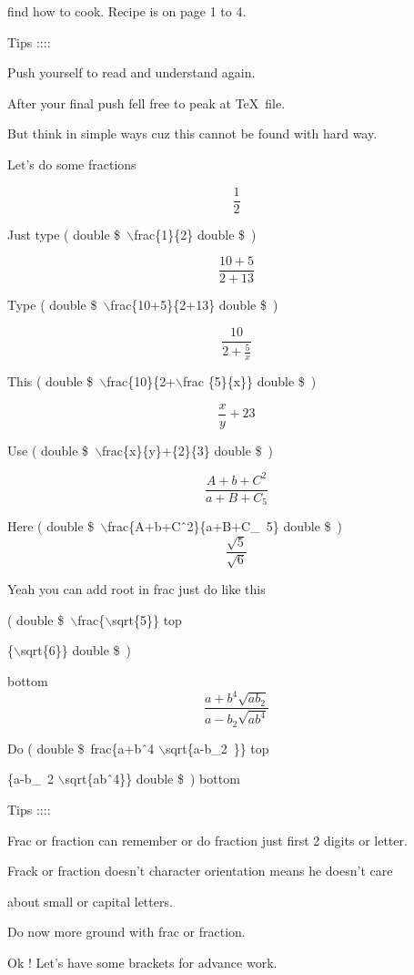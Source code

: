\documentclass[11pt]{article}
\begin{document}
find how to cook. Recipe is on page 1 to 4.

Tips ::::

Push yourself to read and understand again.

After your final push fell free to peak at \TeX\ file.

But think in simple ways cuz this cannot be found with hard way.

\pagebreak

Let's do some fractions

$$\frac{1}{2}$$

Just type ( double \$\ $\backslash$frac\{1\}\{2\} double \$\ )

$$\frac{10+5}{2+13}$$

Type ( double \$\ $\backslash$frac\{10+5\}\{2+13\} double \$\ )

$$\frac{10}{2+\frac{5}{x}}$$

This ( double \$\ $\backslash$frac\{10\}\{2+$\backslash$frac \{5\}\{x\}\} double \$\ )

$$\frac{x}{y}+{2}{3}$$

Use ( double \$\ $\backslash$frac\{x\}\{y\}+\{2\}\{3\} double \$\ )

$$\frac{A+b+C^2}{a+B+C_5}$$

Here ( double \$\ $\backslash$frac\{A+b+C\^\ 2\}\{a+B+C\_\ 5\} double \$\ )
$$\frac{\sqrt{5}}{\sqrt{6}}$$

Yeah you can add root in frac just do like this  

{( double \$\ $\backslash$frac\{$\backslash$sqrt\{5\}\} top

             \{$\backslash$sqrt\{6\}\} double \$\ )} bottom
 $$\frac{a+b^4\sqrt{ab_2}}{a-b_2\sqrt{ab^4}}$$
 
 Do ( double \$\ frac\{a+b\^\ 4 $\backslash$sqrt\{a-b\_2\ \}\} top
 
          \{a-b\_\ 2 $\backslash$sqrt\{ab\^\ 4\}\} double \$\ ) bottom
          
          
\vspace{1cm}

Tips ::::

Frac or fraction can remember or do fraction just first 2 digits or letter.

Frack or fraction doesn't character orientation means he doesn't care

about small or capital letters.

Do now more ground with frac or fraction.
\pagebreak

Ok ! Let's have some brackets for advance work.
\end{document}
